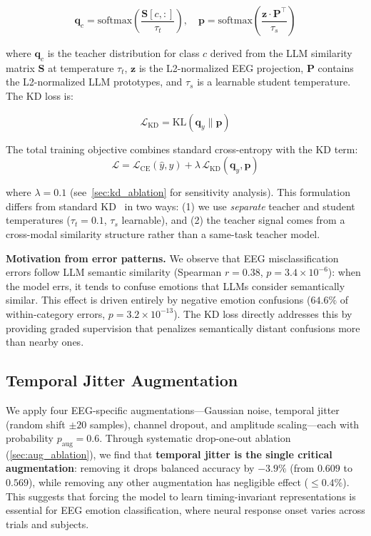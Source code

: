 \begin{equation}
    \mathbf{q}_c = \text{softmax}\left(\frac{\mathbf{S}[c, :]}{\tau_t}\right), \quad
    \mathbf{p} = \text{softmax}\left(\frac{\mathbf{z} \cdot \mathbf{P}^\top}{\tau_s}\right)
\end{equation}

where $\mathbf{q}_c$ is the teacher distribution for class $c$ derived from the LLM similarity matrix $\mathbf{S}$ at temperature $\tau_t$, $\mathbf{z}$ is the L2-normalized EEG projection, $\mathbf{P}$ contains the L2-normalized LLM prototypes, and $\tau_s$ is a learnable student temperature. The KD loss is:

\begin{equation}
    \mathcal{L}_{\text{KD}} = \text{KL}(\mathbf{q}_y \| \mathbf{p})
\end{equation}

The total training objective combines standard cross-entropy with the KD term:
\begin{equation}
    \mathcal{L} = \mathcal{L}_{\text{CE}}(\hat{y}, y) + \lambda \, \mathcal{L}_{\text{KD}}(\mathbf{q}_y, \mathbf{p})
\end{equation}

where $\lambda = 0.1$ (see~\cref{sec:kd_ablation} for sensitivity analysis). This formulation differs from standard KD~\cite{hinton2015distilling} in two ways: (1) we use \emph{separate} teacher and student temperatures ($\tau_t = 0.1$, $\tau_s$ learnable), and (2) the teacher signal comes from a cross-modal similarity structure rather than a same-task teacher model.

\noindent\textbf{Motivation from error patterns.} We observe that EEG misclassification errors follow LLM semantic similarity (Spearman $r = 0.38$, $p = 3.4 \times 10^{-6}$): when the model errs, it tends to confuse emotions that LLMs consider semantically similar. This effect is driven entirely by negative emotion confusions ($64.6\%$ of within-category errors, $p = 3.2 \times 10^{-13}$). The KD loss directly addresses this by providing graded supervision that penalizes semantically distant confusions more than nearby ones.

\subsection{Temporal Jitter Augmentation}
\label{sec:augmentation}
\vspace{-1mm}

We apply four EEG-specific augmentations---Gaussian noise, temporal jitter (random shift $\pm 20$ samples), channel dropout, and amplitude scaling---each with probability $p_{\text{aug}} = 0.6$. Through systematic drop-one-out ablation (\cref{sec:aug_ablation}), we find that \textbf{temporal jitter is the single critical augmentation}: removing it drops balanced accuracy by $-3.9\%$ (from $0.609$ to $0.569$), while removing any other augmentation has negligible effect ($\leq 0.4\%$). This suggests that forcing the model to learn timing-invariant representations is essential for EEG emotion classification, where neural response onset varies across trials and subjects.

